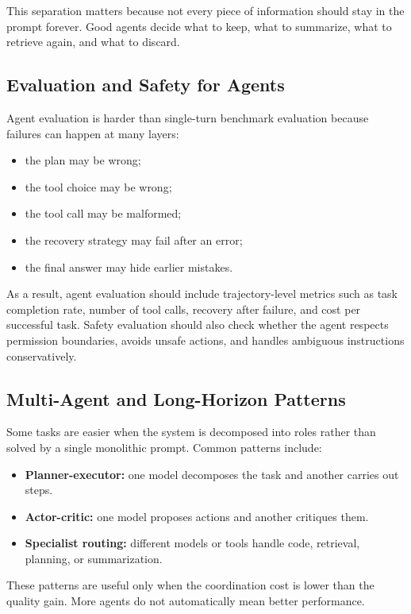 \documentclass[class=article,crop=false]{standalone}
\begin{document}
This separation matters because not every piece of information should stay in the prompt forever. Good agents decide what to keep, what to summarize, what to retrieve again, and what to discard.

\subsection{Evaluation and Safety for Agents}
\label{sec:agents:evaluation}

Agent evaluation is harder than single-turn benchmark evaluation because failures can happen at many layers:
\begin{itemize}
  \item the plan may be wrong;
  \item the tool choice may be wrong;
  \item the tool call may be malformed;
  \item the recovery strategy may fail after an error;
  \item the final answer may hide earlier mistakes.
\end{itemize}

As a result, agent evaluation should include trajectory-level metrics such as task completion rate, number of tool calls, recovery after failure, and cost per successful task. Safety evaluation should also check whether the agent respects permission boundaries, avoids unsafe actions, and handles ambiguous instructions conservatively.

\subsection{Multi-Agent and Long-Horizon Patterns}
\label{sec:agents:patterns}

Some tasks are easier when the system is decomposed into roles rather than solved by a single monolithic prompt. Common patterns include:
\begin{itemize}
  \item \textbf{Planner-executor:} one model decomposes the task and another carries out steps.
  \item \textbf{Actor-critic:} one model proposes actions and another critiques them.
  \item \textbf{Specialist routing:} different models or tools handle code, retrieval, planning, or summarization.
\end{itemize}

These patterns are useful only when the coordination cost is lower than the quality gain. More agents do not automatically mean better performance.
\end{document}
